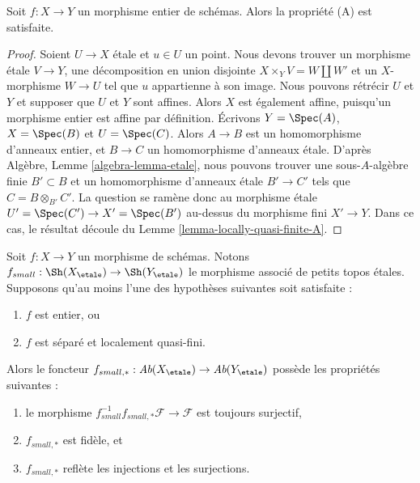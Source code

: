 \begin{lemma}
\label{lemma-integral-A}
Soit $f : X \to Y$ un morphisme entier de sch\'emas.
Alors la propri\'et\'e (A) est satisfaite.
\end{lemma}

\begin{proof}
Soient $U \to X$ \'etale et $u \in U$ un point.
Nous devons trouver un morphisme \'etale $V \to Y$, une d\'ecomposition en union disjointe
$X \times_Y V = W \amalg W'$ et un $X$-morphisme $W \to U$
tel que $u$ appartienne \`a son image. Nous pouvons r\'etr\'ecir $U$ et $Y$ et supposer
que $U$ et $Y$ sont affines. Alors $X$ est \'egalement affine, puisqu'un
morphisme entier est affine par d\'efinition. \'Ecrivons $Y = \Spec(A)$,
$X = \Spec(B)$ et $U = \Spec(C)$. Alors $A \to B$ est un
homomorphisme d'anneaux entier, et $B \to C$ un homomorphisme d'anneaux \'etale. D'apr\`es
Algèbre, Lemme \ref{algebra-lemma-etale},
nous pouvons trouver une sous-$A$-alg\`ebre finie $B' \subset B$ et un homomorphisme d'anneaux \'etale
$B' \to C'$ tels que $C = B \otimes_{B'} C'$. La question
se ram\`ene donc au morphisme \'etale
$U' = \Spec(C') \to X' = \Spec(B')$
au-dessus du morphisme fini $X' \to Y$. Dans ce cas, le r\'esultat d\'ecoule du
Lemme \ref{lemma-locally-quasi-finite-A}.
\end{proof}

\begin{lemma}
\label{lemma-when-push-pull-surjective}
Soit $f : X \to Y$ un morphisme de sch\'emas. Notons
$f_{small} :
\Sh(X_\etale)
\to
\Sh(Y_\etale)$
le morphisme associ\'e de petits topos \'etales. Supposons qu'au moins l'une
des hypoth\`eses suivantes soit satisfaite :
\begin{enumerate}
\item $f$ est entier, ou
\item $f$ est s\'epar\'e et localement quasi-fini.
\end{enumerate}
Alors le foncteur
$f_{small, *} :
\textit{Ab}(X_\etale)
\to
\textit{Ab}(Y_\etale)$
poss\`ede les propri\'et\'es suivantes :
\begin{enumerate}
\item le morphisme
$f_{small}^{-1}f_{small, *}\mathcal{F} \to \mathcal{F}$
est toujours surjectif,
\item $f_{small, *}$ est fid\`ele, et
\item $f_{small, *}$ refl\`ete les injections et les surjections.
\end{enumerate}
\end{lemma}

